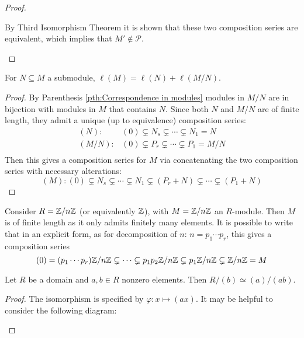 \documentclass{article}
\begin{document}
\begin{proof}
\begin{itemize}
        By Third Isomorphism Theorem it is shown that these two composition series are equivalent, which implies that $M'\notin \mathcal{P}$.
    \end{itemize}
\end{proof}

\begin{corollary}
    For $N\subseteq M$ a submodule, $\ell(M) = \ell(N) + \ell(M/N)$.
\end{corollary}

\begin{proof}
    By Parenthesis \ref{pth:Correspondence in modules} modules in $M/N$ are in bijection with modules in $M$ that contains $N$. Since both $N$ and $M/N$ are of finite length, they admit a unique (up to equivalence) composition series:
    \[
    \begin{array}{cc}
        (N): & (0) \subsetneq N_s \subsetneq \cdots \subsetneq N_1 = N \\
        (M/N): & (0) \subsetneq P_r \subsetneq \cdots \subsetneq P_1 = M/N \\
    \end{array}
    \]
    Then this gives a composition series for $M$ via concatenating the two composition series with necessary alterations:
    \[
        (M): (0) \subsetneq N_s \subsetneq \cdots \subsetneq N_1 \subsetneq (P_r + N) \subsetneq \cdots \subsetneq (P_1 + N)
    \]
\end{proof}

\begin{remark}
    Consider $R = \mathbb{Z}/n\mathbb{Z}$ (or equivalently $\mathbb{Z}$), with $M = \mathbb{Z}/n\mathbb{Z}$ an $R$-module. Then $M$ is of finite length as it only admits finitely many elements. It is possible to write that in an explicit form, as for decomposition of $n$: $n = p_1\cdots p_r$, this gives a composition series
    \[
        (0) = (p_1\cdots p_r)\mathbb{Z}/n\mathbb{Z} \subsetneq \cdots \subsetneq p_1p_2\mathbb{Z}/n\mathbb{Z} \subsetneq p_1\mathbb{Z}/n\mathbb{Z} \subsetneq \mathbb{Z}/n\mathbb{Z} = M
    \]
\end{remark}

\begin{parenthesis}
    Let $R$ be a domain and $a, b\in R$ nonzero elements. Then $R/(b) \simeq (a)/(ab)$. 
\end{parenthesis}

\begin{proof}
    The isomorphism is specified by $\varphi: x\mapsto (ax)$. It may be helpful to consider the following diagram:
    \begin{figure}[htbp]
        \centering
    \end{figure}
\end{proof}
\end{document}
